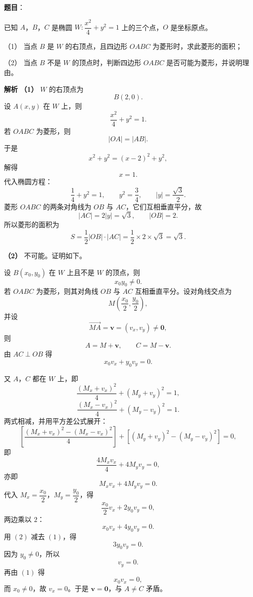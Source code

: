 \begin{answer}

\textbf{题目}：

已知 $A$，$B$，$C$ 是椭圆 $W:\dfrac{x^2}4+y^2=1$ 上的三个点，$O$ 是坐标原点。

（1） 当点 $B$ 是 $W$ 的右顶点，且四边形 $OABC$ 为菱形时，求此菱形的面积；

（2） 当点 $B$ 不是 $W$ 的顶点时，判断四边形 $OABC$ 是否可能为菱形，并说明理由。

\textbf{解析}
\textbf{（1）} $W$ 的右顶点为
\nopagebreak[4]
\[B(2,0).\]
设 $A(x,y)$ 在 $W$ 上，则
\nopagebreak[4]
\[\frac{x^2}4+y^2=1.\]
若 $OABC$ 为菱形，则
\nopagebreak[4]
\[|OA|=|AB|.\]
于是
\nopagebreak[4]
\[x^2+y^2=(x-2)^2+y^2,\]
解得
\nopagebreak[4]
\[x=1.\]
代入椭圆方程：
\nopagebreak[4]
\[\frac14+y^2=1,\qquad y^2=\frac34,\qquad |y|=\frac{\sqrt3}2.\]
菱形 $OABC$ 的两条对角线为 $OB$ 与 $AC$，它们互相垂直平分，故
\nopagebreak[4]
\[|AC|=2|y|=\sqrt3,\qquad |OB|=2.\]
所以菱形的面积为
\nopagebreak[4]
\[S=\frac12|OB|\cdot|AC|=\frac12\times2\times\sqrt3=\sqrt3.\]

\textbf{（2）} 不可能。证明如下。

设 $B(x_0,y_0)$ 在 $W$ 上且不是 $W$ 的顶点，则
\nopagebreak[4]
\[x_0y_0\neq0.\]
若 $OABC$ 为菱形，则其对角线 $OB$ 与 $AC$ 互相垂直平分。设对角线交点为
\nopagebreak[4]
\[M\left(\frac{x_0}2,\frac{y_0}2\right),\]
并设
\nopagebreak[4]
\[\overrightarrow{MA}=\boldsymbol v=(v_x,v_y)\neq\boldsymbol 0,\]
则
\nopagebreak[4]
\[A=M+\boldsymbol v,\qquad C=M-\boldsymbol v.\]
由 $AC\perp OB$ 得
\nopagebreak[4]
\[x_0v_x+y_0v_y=0. \tag{1}\]

又 $A$，$C$ 都在 $W$ 上，即
\nopagebreak[4]
\[\frac{(M_x+v_x)^2}4+(M_y+v_y)^2=1,\]
\nopagebreak[4]
\[\frac{(M_x-v_x)^2}4+(M_y-v_y)^2=1.\]
两式相减，并用平方差公式展开：
\nopagebreak[4]
\[\left[\frac{(M_x+v_x)^2-(M_x-v_x)^2}{4}\right]+\left[(M_y+v_y)^2-(M_y-v_y)^2\right]=0,\]
即
\nopagebreak[4]
\[\frac{4M_xv_x}{4}+4M_yv_y=0,\]
亦即
\nopagebreak[4]
\[M_xv_x+4M_yv_y=0.\]
代入 $M_x=\dfrac{x_0}2$，$M_y=\dfrac{y_0}2$，得
\nopagebreak[4]
\[\frac{x_0}2v_x+2y_0v_y=0,\]
两边乘以 $2$：
\nopagebreak[4]
\[x_0v_x+4y_0v_y=0. \tag{2}\]
用 $(2)$ 减去 $(1)$，得
\nopagebreak[4]
\[3y_0v_y=0.\]
因为 $y_0\neq0$，所以
\nopagebreak[4]
\[v_y=0.\]
再由 $(1)$ 得
\nopagebreak[4]
\[x_0v_x=0,\]
而 $x_0\neq0$，故 $v_x=0$。于是 $\boldsymbol v=\boldsymbol 0$，与 $A\neq C$ 矛盾。


\end{answer}
